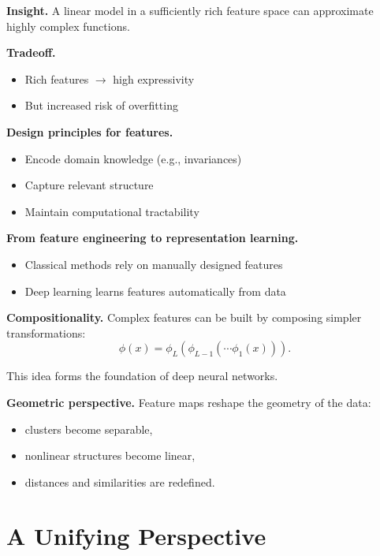 \noindent
\textbf{Insight.}  
A linear model in a sufficiently rich feature space can approximate highly complex functions.

\medskip

\noindent
\textbf{Tradeoff.}
\begin{itemize}
    \item Rich features $\rightarrow$ high expressivity
    \item But increased risk of overfitting
\end{itemize}

\medskip

\noindent
\textbf{Design principles for features.}
\begin{itemize}
    \item Encode domain knowledge (e.g., invariances)
    \item Capture relevant structure
    \item Maintain computational tractability
\end{itemize}

\medskip

\noindent
\textbf{From feature engineering to representation learning.}
\begin{itemize}
    \item Classical methods rely on manually designed features
    \item Deep learning learns features automatically from data
\end{itemize}

\medskip

\noindent
\textbf{Compositionality.}  
Complex features can be built by composing simpler transformations:
\[
\phi(x) = \phi_L(\phi_{L-1}(\cdots \phi_1(x))).
\]

\medskip

\noindent
This idea forms the foundation of deep neural networks.

\medskip

\noindent
\textbf{Geometric perspective.}  
Feature maps reshape the geometry of the data:
\begin{itemize}
    \item clusters become separable,
    \item nonlinear structures become linear,
    \item distances and similarities are redefined.
\end{itemize}

\section{A Unifying Perspective}

